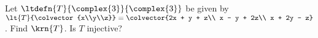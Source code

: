 Let $\ltdefn{T}{\complex{3}}{\complex{3}}$ be given by 
$\lt{T}{\colvector{x\\y\\z}} = \colvector{2x + y + z\\ x - y + 2z\\ x + 2y - z}$.  
Find $\krn{T}$.  
Is $T$ injective?
